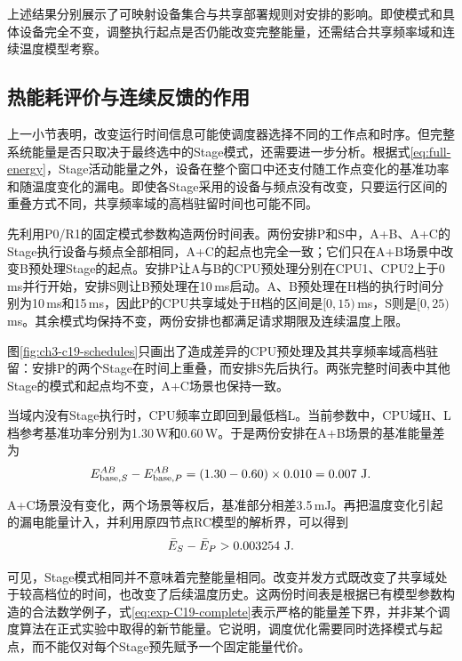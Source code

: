 上述结果分别展示了可映射设备集合与共享部署规则对安排的影响。即使模式和具体设备完全不变，调整执行起点是否仍能改变完整能量，还需结合共享频率域和连续温度模型考察。



\subsection{热能耗评价与连续反馈的作用}

上一小节表明，改变运行时间信息可能使调度器选择不同的工作点和时序。但完整系统能量是否只取决于最终选中的Stage模式，还需要进一步分析。根据式\eqref{eq:full-energy}，Stage活动能量之外，设备在整个窗口中还支付随工作点变化的基准功率和随温度变化的漏电。即使各Stage采用的设备与频点没有改变，只要运行区间的重叠方式不同，共享频率域的高档驻留时间也可能不同。

先利用P0/R1的固定模式参数构造两份时间表。两份安排P和S中，A+B、A+C的Stage执行设备与频点全部相同，A+C的起点也完全一致；它们只在A+B场景中改变B预处理Stage的起点。安排P让A与B的CPU预处理分别在CPU1、CPU2上于0\,ms并行开始，安排S则让B预处理在10\,ms启动。A、B预处理在H档的执行时间分别为10\,ms和15\,ms，因此P的CPU共享域处于H档的区间是$[0,15)$\,ms，S则是$[0,25)$\,ms。其余模式均保持不变，两份安排也都满足请求期限及连续温度上限。

图\ref{fig:ch3-c19-schedules}只画出了造成差异的CPU预处理及其共享频率域高档驻留：安排P的两个Stage在时间上重叠，而安排S先后执行。两张完整时间表中其他Stage的模式和起点均不变，A+C场景也保持一致。



当域内没有Stage执行时，CPU频率立即回到最低档L。当前参数中，CPU域H、L档参考基准功率分别为1.30\,W和0.60\,W。于是两份安排在A+B场景的基准能量差为
\begin{equation}
 E^{AB}_{{\rm base},S}-E^{AB}_{{\rm base},P}
 =(1.30-0.60)\times0.010=0.007\ {\rm J}.
 \label{eq:exp-C19-baseline}
\end{equation}

A+C场景没有变化，两个场景等权后，基准部分相差3.5\,mJ。再把温度变化引起的漏电能量计入，并利用原四节点RC模型的解析界，可以得到
\begin{equation}
 \bar E_S-\bar E_P>0.003254\ {\rm J}.
 \label{eq:exp-C19-complete}
\end{equation}

可见，Stage模式相同并不意味着完整能量相同。改变并发方式既改变了共享域处于较高档位的时间，也改变了后续温度历史。这两份时间表是根据已有模型参数构造的合法数学例子，式\eqref{eq:exp-C19-complete}表示严格的能量差下界，并非某个调度算法在正式实验中取得的新节能量。它说明，调度优化需要同时选择模式与起点，而不能仅对每个Stage预先赋予一个固定能量代价。

